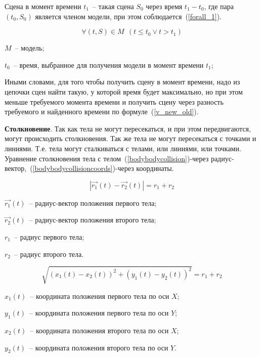 Сцена в момент времени \(t_1\)~-- такая сцена \(S_0\) через время \(t_1 - t_0\),
где пара \((t_0, S_0)\) является членом модели, при этом соблюдается~(\ref{forall_1}).

\begin{equation}\label{forall_1}
  \forall (t, S) \in M~~(t \leqslant  t_0 \vee t > t_1)
\end{equation}

\begin{Underequation}
  \(M\)~-- модель;

  \(t_0\)~-- время, выбранное для получения модели в момент времени \(t_1\);
\end{Underequation}

Иными словами, для того чтобы получить сцену в момент времени, надо из цепочки сцен найти такую,
у которой время будет максимально, но при этом меньше требуемого момента времени и получить
сцену через разность требуемого и найденного времени по формуле~(\ref{v_new_old}).

\textbf{Столкновение}. Так как тела не могут пересекаться, и при этом передвигаются, могут происходить столкновения.
Так же тела не могут пересекаться с точками и линиями. Т.е. тела могут сталкиваться с телами, или линиями, или точками.
Уравнение столкновения тела с телом~(\ref{bodybodycollision})-через радиус-вектор,~(\ref{bodybodycollisioncoords})-через координаты.

\begin{equation}\label{bodybodycollision}
  \left|\vec{r_1}(t) - \vec{r_2}(t)\right| = r_1 + r_2
\end{equation}

\begin{Underequation}
  \(\vec{r_1}(t)\)~-- радиус-вектор положения первого тела;

  \(\vec{r_2}(t)\)~-- радиус-вектор положения второго тела;

  \(r_1\)~-- радиус первого тела;

  \(r_2\)~-- радиус второго тела.
\end{Underequation}

\begin{equation}\label{bodybodycollisioncoords}
  \sqrt{(x_1(t) - x_2(t))^2 + (y_1(t) - y_2(t))^2} = r_1 + r_2
\end{equation}

\begin{Underequation}
  \(x_1(t)\)~-- координата положения первого тела по оси \(X\);

  \(y_1(t)\)~-- координата положения первого тела по оси \(Y\);

  \(x_2(t)\)~-- координата положения второго тела по оси \(X\);

  \(y_2(t)\)~-- координата положения второго тела по оси \(Y\).
\end{Underequation}

